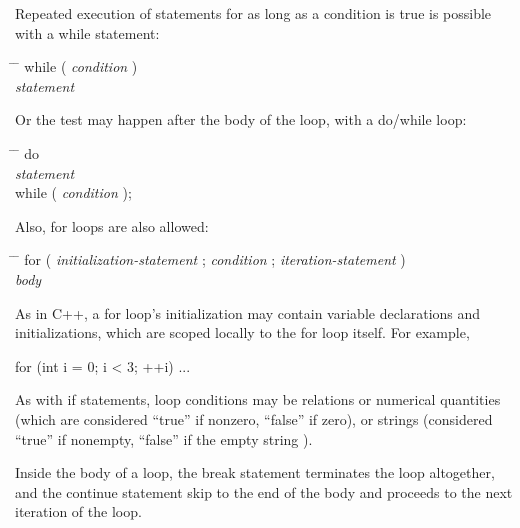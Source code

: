 \documentclass[11pt,letterpaper]{book}
\begin{document}
Repeated execution of statements for as long as a condition is true is
possible with a {\cf while} statement:

\begin{tabbing}
\hspace{0.5in} \= \hspace{0.3in} \= \kill
\> {\cf while (} \emph{condition} {\cf )} \\
\> \> \emph{statement}  
\end{tabbing}

Or the test may happen after the body of the loop, with a {\cf do/while}
loop:

\begin{tabbing}
\hspace{0.5in} \= \hspace{0.3in} \= \kill
\> {\cf do } \\
\> \> \emph{statement}  \\
\> {\cf while (} \emph{condition} {\cf );} \\
\end{tabbing}

\noindent Also, {\cf for} loops are also allowed:

\begin{tabbing}
\hspace{0.5in} \= \hspace{0.3in} \= \kill
\> {\cf for (} \emph{initialization-statement} {\cf ;} \emph{condition} {\cf ;} \emph{iteration-statement} {\cf )} \\
\> \> \emph{body}  
\end{tabbing}

As in C++, a {\cf for} loop's initialization may contain variable
declarations and initializations, which are scoped locally to the {\cf for}
loop itself.  For example,

\begin{code}
      for (int i = 0;  i < 3;  ++i) {
          ...
      }
\end{code}

As with {\cf if} statements, loop conditions may be relations or
numerical quantities (which are considered ``true'' if nonzero, 
``false'' if zero), or strings (considered ``true'' if nonempty,
``false'' if the empty string \qkw{}).

Inside the body of a loop, the {\cf break} statement terminates the loop
altogether, and the {\cf continue} statement skip to the end of the body
and proceeds to the next iteration of the loop.
\end{document}
